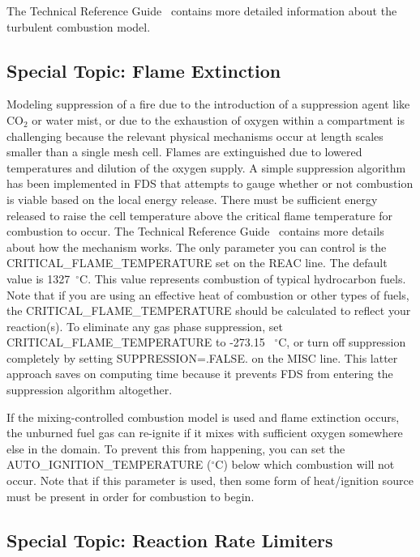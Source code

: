 \documentclass[11pt]{book}
\begin{document}
The Technical Reference Guide~\cite{FDS_Math_Guide} contains more detailed information about the turbulent combustion model.

\subsection{Special Topic: Flame Extinction}

\label{info:extinction}

Modeling suppression of a fire due to the introduction of a suppression
agent like CO$_2$ or water mist, or due to the exhaustion of oxygen
within a compartment is challenging because
the relevant physical mechanisms occur at length scales smaller than a
single mesh cell. Flames are extinguished due to lowered
temperatures and dilution of the oxygen supply. A simple
suppression algorithm has been implemented in FDS that attempts to
gauge whether or not combustion is viable based on the local energy release. There must be sufficient energy released to raise the cell temperature above the critical flame temperature for combustion to occur. The Technical Reference Guide~\cite{FDS_Math_Guide}
contains more details about how the mechanism works. The only
parameter you can control is the {\ct CRITICAL\_FLAME\_TEMPERATURE} set on the {\ct REAC} line.
The default value is 1327~$^\circ$C. This value represents combustion of typical hydrocarbon fuels. Note that if you are using an effective heat of combustion or other types of fuels, the {\ct CRITICAL\_FLAME\_TEMPERATURE} should be calculated to reflect your reaction(s).
To eliminate any gas phase suppression, set  {\ct CRITICAL\_FLAME\_TEMPERATURE} to -273.15 ~$^\circ$C, or turn off suppression completely
by setting {\ct SUPPRESSION=.FALSE.} on the {\ct MISC} line. This latter approach saves on computing time because it
prevents FDS from entering the suppression algorithm altogether.

If the mixing-controlled combustion model is used and flame extinction occurs, the unburned fuel gas can re-ignite if it mixes with sufficient oxygen somewhere
else in the domain. To prevent this from happening, you can set the {\ct AUTO\_IGNITION\_TEMPERATURE} ($^\circ$C) below which combustion will not occur.
Note that if this parameter is used, then some form of heat/ignition source must be present in order for combustion to begin.

\subsection{Special Topic: Reaction Rate Limiters}
\label{info:REAC_Limiters}
\end{document}
